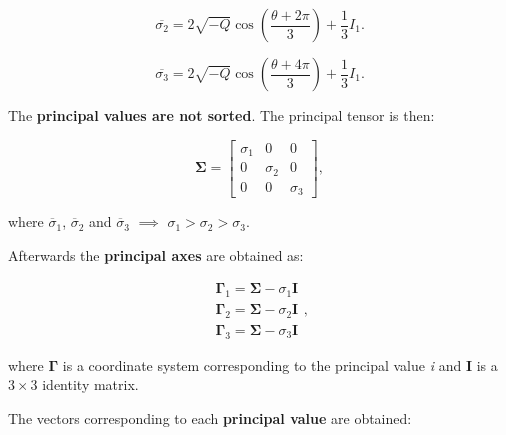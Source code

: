 \begin{itemize}
        \begin{equation}
            \overline{\sigma_{2}}
            = 2 \sqrt{-Q} \cos{\left(\frac{\theta + 2 \pi}{3}\right)} + \frac{1}{3}I_{1}
        .\end{equation}

        \begin{equation}
            \overline{\sigma_{3}}
            = 2 \sqrt{-Q} \cos{\left(\frac{\theta + 4 \pi}{3}\right)} + \frac{1}{3}I_{1}
        .\end{equation}

        The \textbf{principal values are not sorted}. The principal tensor is then:

        \begin{equation}
            \mathbf{\Sigma} = \begin{bmatrix}
                \sigma_{1} & 0 & 0 \\
                0 & \sigma_{2}  & 0 \\
                0 & 0 & \sigma_{3}
            \end{bmatrix}
        ,\end{equation}

        where $\overline{\sigma}_{1}$, $\overline{\sigma}_{2}$ and $\overline{\sigma}_{3}$
        $\implies$ $\sigma_1 > \sigma_2 > \sigma_3$.

        Afterwards the \textbf{principal axes} are obtained as:

        \begin{equation}
            \begin{array}{l}
                \mathbf{\Gamma}_{1} = \mathbf{\Sigma} - \sigma_{1}\mathbf{I} \\
                \mathbf{\Gamma}_{2} = \mathbf{\Sigma} - \sigma_{2}\mathbf{I} \\
                \mathbf{\Gamma}_{3} = \mathbf{\Sigma} - \sigma_{3}\mathbf{I}
            \end{array}
        ,\end{equation}

        where $\mathbf{\Gamma}$ is a coordinate system corresponding to the
        principal value \textit{i} and $\mathbf{I}$ is a $3 \times 3$
        identity matrix.

        The vectors corresponding to each \textbf{principal value} are obtained:


\end{itemize}
